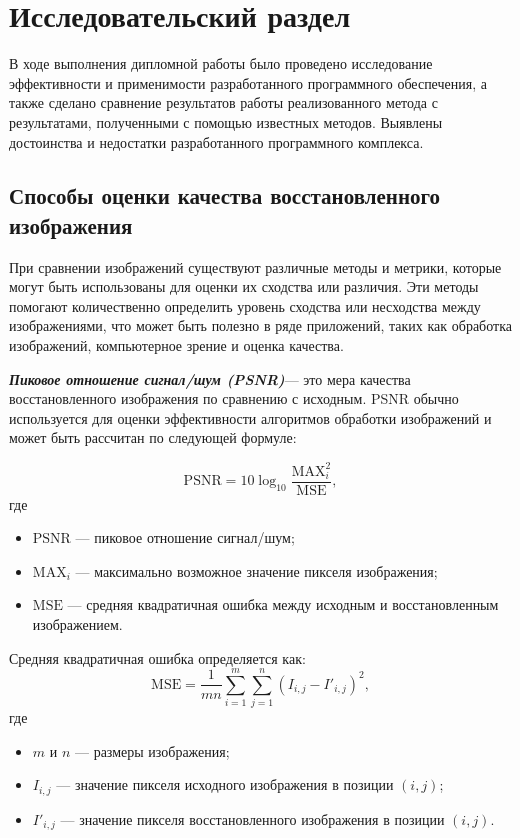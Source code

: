 \chapter{Исследовательский раздел}
\label{cha:research}

В ходе выполнения дипломной работы было проведено исследование эффективности и применимости разработанного программного обеспечения, а также сделано сравнение результатов работы реализованного метода с результатами, полученными с помощью известных методов. Выявлены достоинства и недостатки разработанного программного комплекса.

\section{Способы оценки качества восстановленного изображения}

При сравнении изображений существуют различные методы и метрики, которые могут быть использованы для оценки их сходства или различия. Эти методы помогают количественно определить уровень сходства или несходства между изображениями, что может быть полезно в ряде приложений, таких как обработка изображений, компьютерное зрение и оценка качества.

\textbf{\textit{Пиковое отношение сигнал/шум (PSNR)}}--- это мера качества восстановленного изображения по сравнению с исходным\cite{metrics}. PSNR обычно используется для оценки эффективности алгоритмов обработки изображений и может быть рассчитан по следующей формуле:

\begin{equation}
    \text{PSNR} = 10 \log_{10} \frac{\text{MAX}_{i}^2}{\text{MSE}},
\end{equation}
где
\begin{itemize}
    \item $\text{PSNR}$ --- пиковое отношение сигнал/шум;
    \item $\text{MAX}_{i}$ --- максимально возможное значение пикселя изображения;
    \item $\text{MSE}$ --- средняя квадратичная ошибка между исходным и восстановленным изображением.
\end{itemize}

Средняя квадратичная ошибка определяется как:
\begin{equation}
    \text{MSE} = \frac{1}{mn} \sum_{i=1}^{m} \sum_{j=1}^{n} (I_{i,j} - I'_{i,j})^2,
\end{equation}
где
\begin{itemize}
    \item $m$ и $n$ --- размеры изображения;
    \item $I_{i,j}$ --- значение пикселя исходного изображения в позиции $(i,j)$;
    \item $I'_{i,j}$ --- значение пикселя восстановленного изображения в позиции $(i,j)$.
\end{itemize}


